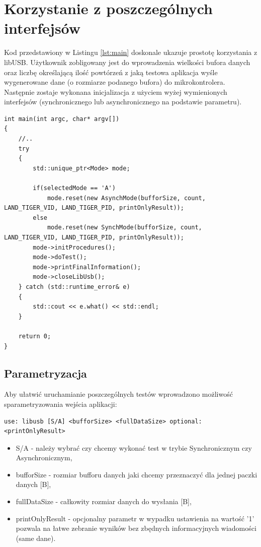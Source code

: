 \documentclass{BscUS}
\begin{document}
\section{Korzystanie z poszczególnych interfejsów}
Kod przedstawiony w Listingu \ref{lst:main} doskonale ukazuje prostotę korzystania z libUSB. Użytkownik zobligowany jest do wprowadzenia wielkości bufora danych oraz liczbę określającą ilość powtórzeń z jaką testowa aplikacja wyśle wygenerowane dane (o rozmiarze podanego bufora) do mikrokontrolera. Następnie zostaje wykonana inicjalizacja z użyciem wyżej wymienionych interfejsów (synchronicznego lub asynchronicznego na podstawie parametru).
\begin{lstlisting}[caption={Przykład użycia interfejsu synchronicznego lub asynchronicznego w zależności od parametryzacji},label={lst:main}]
int main(int argc, char* argv[])
{
	//..
	try 
	{
		std::unique_ptr<Mode> mode;

		if(selectedMode == 'A')
			mode.reset(new AsynchMode(bufforSize, count, LAND_TIGER_VID, LAND_TIGER_PID, printOnlyResult));
		else 
			mode.reset(new SynchMode(bufforSize, count, LAND_TIGER_VID, LAND_TIGER_PID, printOnlyResult));
		mode->initProcedures();
		mode->doTest();
		mode->printFinalInformation();
		mode->closeLibUsb();
	} catch (std::runtime_error& e)
	{
		std::cout << e.what() << std::endl;
	}

	return 0;
}

\end{lstlisting}
\subsection{Parametryzacja}
\noindent Aby ułatwić uruchamianie poszczególnych testów wprowadzono możliwość sparametryzowania wejścia aplikacji:
\begin{lstlisting}[caption={uruchomienie testu}]
use: libusb [S/A] <bufforSize> <fullDataSize> optional:<printOnlyResult>
\end{lstlisting}
\begin{itemize}
\item S/A - należy wybrać czy chcemy wykonać test w trybie Synchronicznym czy Asynchronicznym,
\item bufforSize - rozmiar bufforu danych jaki chcemy przeznaczyć dla jednej paczki danych [B],
\item fullDataSize - całkowity rozmiar danych do wysłania [B],
\item printOnlyResult - opcjonalny parametr w wypadku ustawienia na wartość '1' pozwala na łatwe zebranie wyników bez zbędnych informacyjnych wiadomości (same dane). 
\end{itemize}
\end{document}

